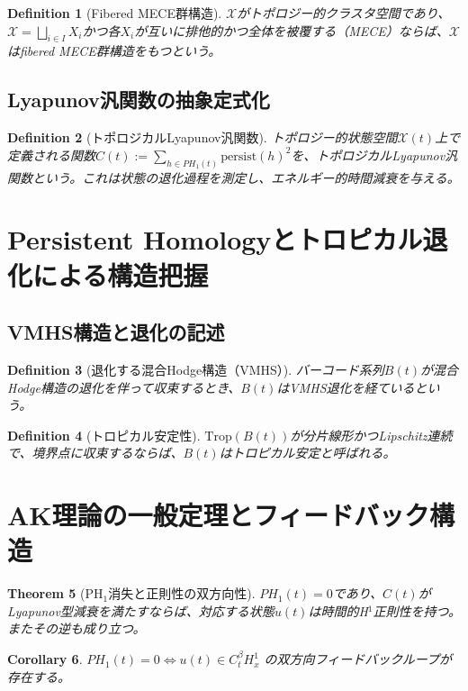 \documentclass[11pt]{article}
\newtheorem{theorem}{Theorem}[section]
\newtheorem{definition}[theorem]{Definition}
\newtheorem{corollary}[theorem]{Corollary}
\begin{document}
\begin{definition}[Fibered MECE群構造]
\(\mathcal{X}\)がトポロジー的クラスタ空間であり、\(\mathcal{X} = \bigsqcup_{i \in I} X_i\)かつ各\(X_i\)が互いに排他的かつ全体を被覆する（MECE）ならば、\(\mathcal{X}\)はfibered MECE群構造をもつという。
\end{definition}

\subsection{Lyapunov汎関数の抽象定式化}
\begin{definition}[トポロジカルLyapunov汎関数]
トポロジー的状態空間\(\mathcal{X}(t)\)上で定義される関数\(C(t) := \sum_{h\in PH_1(t)} \text{persist}(h)^2\)を、トポロジカルLyapunov汎関数という。これは状態の退化過程を測定し、エネルギー的時間減衰を与える。
\end{definition}

\section{Persistent Homologyとトロピカル退化による構造把握}
\subsection{VMHS構造と退化の記述}
\begin{definition}[退化する混合Hodge構造（VMHS）]
バーコード系列\(B(t)\)が混合Hodge構造の退化を伴って収束するとき、\(B(t)\)はVMHS退化を経ているという。
\end{definition}

\begin{definition}[トロピカル安定性]
\(\text{Trop}(B(t))\)が分片線形かつLipschitz連続で、境界点に収束するならば、\(B(t)\)はトロピカル安定と呼ばれる。
\end{definition}

\section{AK理論の一般定理とフィードバック構造}
\begin{theorem}[PH\(_1\)消失と正則性の双方向性]
\(PH_1(t) = 0\)であり、\(C(t)\)がLyapunov型減衰を満たすならば、対応する状態\(u(t)\)は時間的H\(^1\)正則性を持つ。またその逆も成り立つ。
\end{theorem}

\begin{corollary}
\(PH_1(t) = 0 \iff u(t) \in C^\beta_t H^1_x\) の双方向フィードバックループが存在する。
\end{corollary}
\end{document}
